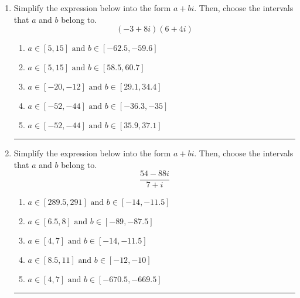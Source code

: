 \documentclass[14pt]{extbook}
\newcommand{\litem}[1]{\item#1\hspace*{-1cm}\rule{\textwidth}{0.4pt}}
\begin{document}
\begin{enumerate}
{\begin{enumerate}[label=\Alph*.]
\end{enumerate} }
\litem{
Simplify the expression below into the form $a+bi$. Then, choose the intervals that $a$ and $b$ belong to.\[ (-3 + 8 i)(6 + 4 i) \]\begin{enumerate}[label=\Alph*.]
\item \( a \in [5, 15] \text{ and } b \in [-62.5, -59.6] \)
\item \( a \in [5, 15] \text{ and } b \in [58.5, 60.7] \)
\item \( a \in [-20, -12] \text{ and } b \in [29.1, 34.4] \)
\item \( a \in [-52, -44] \text{ and } b \in [-36.3, -35] \)
\item \( a \in [-52, -44] \text{ and } b \in [35.9, 37.1] \)

\end{enumerate} }
\litem{
Simplify the expression below into the form $a+bi$. Then, choose the intervals that $a$ and $b$ belong to.\[ \frac{54 - 88 i}{7 + i} \]\begin{enumerate}[label=\Alph*.]
\item \( a \in [289.5, 291] \text{ and } b \in [-14, -11.5] \)
\item \( a \in [6.5, 8] \text{ and } b \in [-89, -87.5] \)
\item \( a \in [4, 7] \text{ and } b \in [-14, -11.5] \)
\item \( a \in [8.5, 11] \text{ and } b \in [-12, -10] \)
\item \( a \in [4, 7] \text{ and } b \in [-670.5, -669.5] \)

\end{enumerate} }
\end{enumerate}
\end{document}
